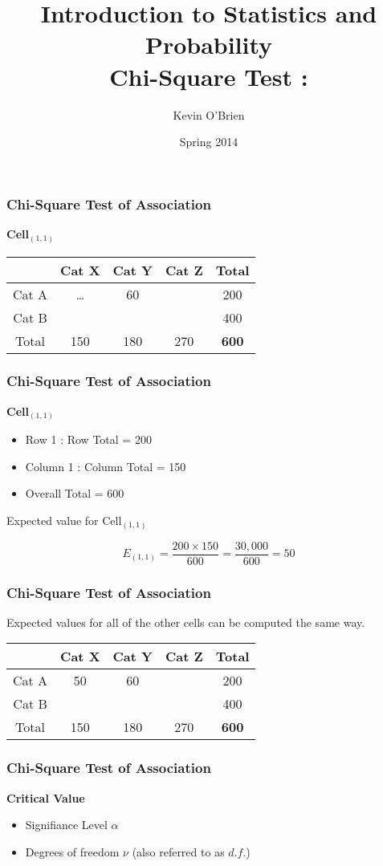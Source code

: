 \documentclass[a4]{beamer}
\title[Stats-Lab.com]{\LARGE Introduction to Statistics and Probability \\ {\Large Chi-Square Test : }}
\author[Kevin O'Brien]{Kevin O'Brien}
\date{Spring 2014}
\begin{document}
\begin{frame}
\titlepage
\end{frame}

\begin{frame}
	\frametitle{Chi-Square Test of Association}
	
	\Large
	\textbf{Cell$_{(1,1)}$}
	\begin{center}
		\begin{tabular}{|c|c|c|c|c|}
			\hline & Cat X & Cat Y & Cat Z & Total  \\ \hline
			Cat A & \alert{\ldots}& 60 &  & 200\\ \hline
			Cat B & \phantom{space}& \phantom{space} & \phantom{space} & 400 \\ \hline
			Total & 150 & 180 & 270 &  \textbf{600}\\ \hline
			
		\end{tabular} 
	\end{center}
	
\end{frame}

\begin{frame}
	\frametitle{Chi-Square Test of Association}
	\Large
	\textbf{Cell$_{(1,1)}$}
	\begin{itemize}
		\item Row 1 : Row Total = 200
		\item Column 1 : Column Total = 150
		\item Overall Total = 600
	\end{itemize}
	\bigskip
	
	
	Expected value for Cell$_{(1,1)}$
	
	\[ E_{(1,1)} = \frac{200 \times 150}{600} = \frac{30,000}{600} = 50 \]
\end{frame}
\begin{frame}
	\frametitle{Chi-Square Test of Association}
	
	\Large
	Expected values for all of the other cells can be computed the same way.
	\begin{center}
		\begin{tabular}{|c|c|c|c|c|}
			\hline & Cat X & Cat Y & Cat Z & Total  \\ \hline
			Cat A & 50 & 60 &  & 200\\ \hline
			Cat B & \phantom{space}& \phantom{space} & \phantom{space} & 400 \\ \hline
			Total & 150 & 180 & 270 &  \textbf{600}\\ \hline
			
		\end{tabular} 
	\end{center}
	
	
\end{frame}

\begin{frame}
\frametitle{Chi-Square Test of Association}

\Large
\textbf{Critical Value}

\begin{itemize}
\item Signifiance Level $\alpha$
\item Degrees of freedom $\nu$ (also referred to as $d.f.$)
\end{itemize}

\end{frame}
\end{document}
